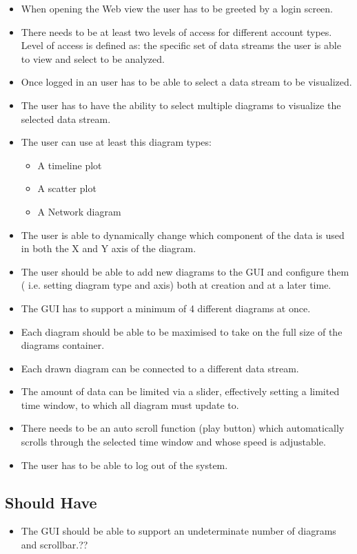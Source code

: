 \documentclass[twoside, english, draft]{Pflichtenheft}
\begin{document}
\begin{itemize}
\item{When opening the Web view the user has to be greeted by a login screen.}

\item{There needs to be at least two levels of access for different account types.
Level of access is defined as: the specific set of data streams the user is able to view and select to be analyzed.}
\item{Once logged in an user has to be able to select a data stream to be visualized.}
\item{The user has to have the ability to select multiple diagrams to visualize the selected data stream.}
\item{The user can use at least this diagram types:}
\begin{itemize}
\item{A timeline plot}
\item{A scatter plot}
\item{A Network diagram}
\end{itemize}
\item{The user is able to dynamically change which component of the data is used in both the X and Y axis of the diagram.}
\item{The user should be able to add new diagrams to the GUI and configure them ( i.e. setting diagram type and axis) both at creation and at a later time.
}
\item{The GUI has to support a minimum of 4 different diagrams at once.}
\item{Each diagram should be able to be maximised to take on the full size of the diagrams container.}
\item{Each drawn diagram can be connected to a different data stream.}
\item{The amount of data can be limited via a slider, effectively setting a limited time window, to which all diagram must update to.}
\item{There needs to be an auto scroll function (play button) which automatically scrolls through the selected time window and whose speed is adjustable.}
\item{The user has to be able to log out of the system.}

\end{itemize}

\subsection{Should Have}
\begin{itemize}
\item{The GUI should be able to support an undeterminate number of diagrams and scrollbar.??}
\end{itemize}
\end{document}
